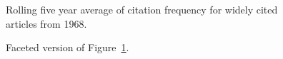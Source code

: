 \documentclass[
  10pt,
  letterpaper,
  DIV=11,
  numbers=noendperiod,
  twoside]{scrartcl}
\begin{document}
\begin{figure}


\caption{\label{fig-citation-spaghetti-1968}Rolling five year average of
citation frequency for widely cited articles from 1968.}

\end{figure}%

\begin{figure}


\caption{\label{fig-citation-facet-1968}Faceted version of
Figure~\ref{fig-citation-spaghetti-1968}.}

\end{figure}%
\end{document}
